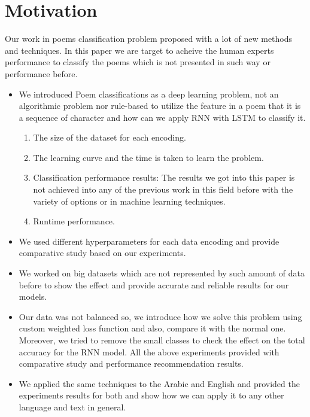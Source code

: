 \section*{Motivation}
Our work in poems classification problem proposed with a lot of new methods and techniques. In this paper we are target to acheive the human experts performance to classify the poems which is not presented in such way or  performance before. 
\begin{itemize}
\item  We introduced Poem classifications as a deep learning problem, not an algorithmic problem nor rule-based to utilize the feature in a poem that it is a sequence of character and how can we apply RNN with LSTM to classify it.
  \begin{enumerate}
    \item The size of the dataset for each encoding.
    \item The learning curve and the time is taken to learn the problem.
    \item Classification performance results: The results we got into this paper is not achieved into any of the previous work in this field before with the variety of options or in machine learning techniques.

    \item Runtime performance.
  \end{enumerate}

\item We used different hyperparameters for each data encoding and provide comparative study based on our experiments.
\item We worked on big datasets which are not represented by such amount of data before to show the effect and provide accurate and reliable results for our models.
\item Our data was not balanced so, we introduce how we solve this problem using custom weighted loss function and also, compare it with the normal one. Moreover, we tried to remove the small classes to check the effect on the total accuracy for the RNN model. All the above experiments provided with comparative study and performance recommendation results.
\item We applied the same techniques to the Arabic and English and provided the experiments results for both and show how we can apply it to any other language and text in general.
  
\end{itemize}

